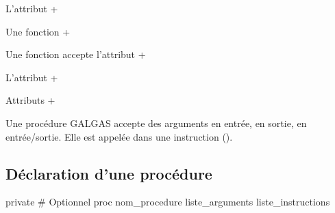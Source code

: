 L'attribut \ggs+%

Une fonction \ggs+%








Une fonction accepte l'attribut \ggs+%


L'attribut \ggs+%

Attributs \ggs+%







Une procédure GALGAS accepte des arguments en entrée, en sortie, en entrée/sortie. Elle est appelée dans une instruction ().

\subsection{Déclaration d'une procédure}

\begin{galgas}
private # Optionnel
proc nom_procedure liste_arguments {
  liste_instructions
}
\end{galgas}


